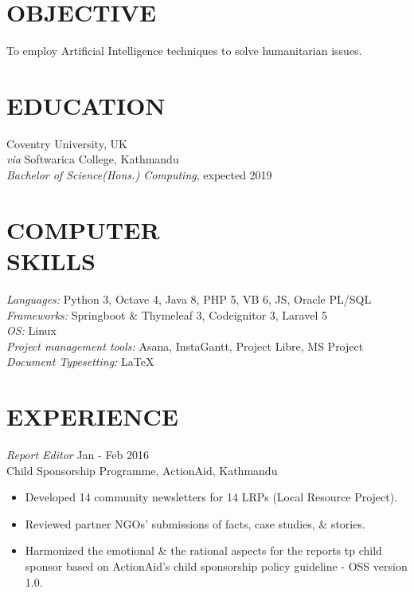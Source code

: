 \documentclass[margin, 10pt]{res}
\begin{document}
\address{Ilam-7, Ilam, Nepal \\   (+977) 984-3673528 \\   bijuale.com.np \\   bijuale@hotmail.com}


\begin{resume}

\section{OBJECTIVE}
To employ Artificial Intelligence techniques to solve humanitarian issues.

\section{EDUCATION}
Coventry University, UK\\
\emph{via} Softwarica College, Kathmandu\\
\emph{Bachelor of Science(Hons.) Computing}, expected 2019

\section{COMPUTER \\SKILLS}
\emph{Languages:} Python 3, Octave 4, Java 8, PHP 5, VB 6, JS, Oracle PL/SQL\\
\emph{Frameworks:} Springboot \& Thymeleaf 3, Codeignitor 3, Laravel 5\\
\emph{OS:} Linux\\
\emph{Project management tools:} Asana, InstaGantt, Project Libre, MS  Project\\
\emph{Document Typesetting:} \LaTeX

\section{EXPERIENCE}
\emph {Report Editor} \hfill Jan - Feb 2016\\
Child Sponsorship Programme, ActionAid, Kathmandu
\begin{itemize}
	\item Developed 14 community newsletters for 14 LRPs (Local Resource Project).
	\item Reviewed partner NGOs' submissions of facts, case studies, \& stories.
	\item Harmonized the emotional \& the rational aspects for the reports tp child sponsor based on ActionAid's child sponsorship policy guideline - OSS version 1.0.
\end{itemize} 


\end{resume}
\end{document}
